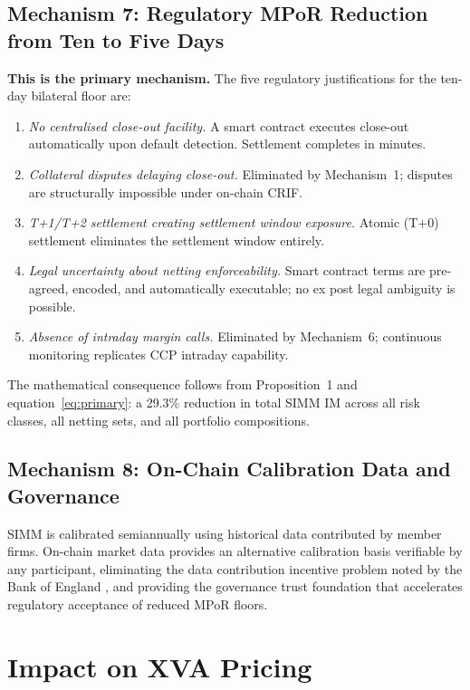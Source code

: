 \documentclass[12pt,letterpaper]{article}
\numberwithin{equation}{section}
\theoremstyle{remark}
\begin{document}
\subsection{Mechanism 7: Regulatory MPoR Reduction from Ten to Five Days}
\label{subsec:m7}

\textbf{This is the primary mechanism.} The five regulatory justifications
for the ten-day bilateral floor \citep[§3.3]{bcbs_iosco_2015} are:
\begin{enumerate}[leftmargin=2.5em,itemsep=3pt,topsep=4pt]
  \item \textit{No centralised close-out facility.} A smart contract
    executes close-out automatically upon default detection. Settlement
    completes in minutes.
  \item \textit{Collateral disputes delaying close-out.} Eliminated by
    Mechanism~1; disputes are structurally impossible under on-chain CRIF.
  \item \textit{T+1/T+2 settlement creating settlement window exposure.}
    Atomic (T+0) settlement eliminates the settlement window entirely.
  \item \textit{Legal uncertainty about netting enforceability.} Smart
    contract terms are pre-agreed, encoded, and automatically executable;
    no ex post legal ambiguity is possible.
  \item \textit{Absence of intraday margin calls.} Eliminated by
    Mechanism~6; continuous monitoring replicates CCP intraday capability.
\end{enumerate}
The mathematical consequence follows from Proposition~1 and
equation~\eqref{eq:primary}: a 29.3\% reduction in total SIMM IM across all
risk classes, all netting sets, and all portfolio compositions.

\subsection{Mechanism 8: On-Chain Calibration Data and Governance}

SIMM is calibrated semiannually using historical data contributed by member
firms. On-chain market data provides an alternative calibration basis
verifiable by any participant, eliminating the data contribution incentive
problem noted by the Bank of England \citep{pra_2022}, and providing the
governance trust foundation that accelerates regulatory acceptance of reduced
MPoR floors.

\section{Impact on XVA Pricing}
\label{sec:xva}
\end{document}

